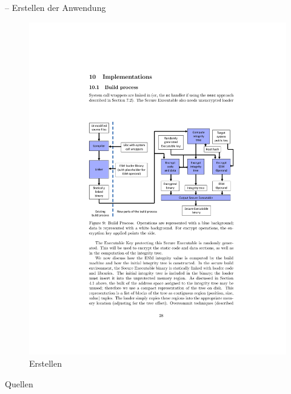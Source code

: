 \documentclass[fleqn,11pt,aspectratio=43,table]{beamer}
\newlength\foo
\begin{document}
\begin{frame}{\insertsectionhead -- Erstellen der Anwendung}
	\vspace{-0.3em}
	\begin{figure}
		\centering
		\includegraphics[width=.85\columnwidth]{build}
		\caption*{\footnotesize Erstellen\cite{boivie2013secureblue++:big}}
	\end{figure}
\end{frame}

\begin{frame}[allowframebreaks]{Quellen}
		
	  
\end{frame}

%
\end{document}
